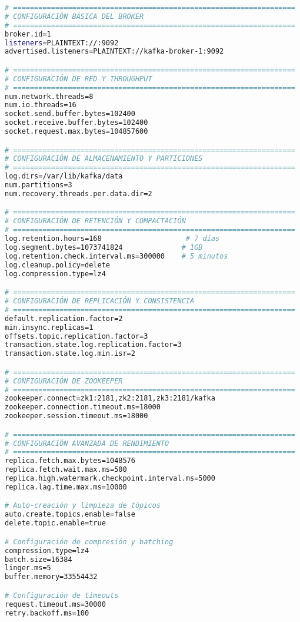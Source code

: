 \begin{lstlisting}[language=bash, caption=Configuración de Broker Kafka para Alto Rendimiento, label=lst:kafka_config]
# ===================================================================
# CONFIGURACIÓN BÁSICA DEL BROKER
# ===================================================================
broker.id=1
listeners=PLAINTEXT://:9092
advertised.listeners=PLAINTEXT://kafka-broker-1:9092

# ===================================================================
# CONFIGURACIÓN DE RED Y THROUGHPUT
# ===================================================================
num.network.threads=8
num.io.threads=16
socket.send.buffer.bytes=102400
socket.receive.buffer.bytes=102400
socket.request.max.bytes=104857600

# ===================================================================
# CONFIGURACIÓN DE ALMACENAMIENTO Y PARTICIONES
# ===================================================================
log.dirs=/var/lib/kafka/data
num.partitions=3
num.recovery.threads.per.data.dir=2

# ===================================================================
# CONFIGURACIÓN DE RETENCIÓN Y COMPACTACIÓN
# ===================================================================
log.retention.hours=168                    # 7 días
log.segment.bytes=1073741824              # 1GB
log.retention.check.interval.ms=300000    # 5 minutos
log.cleanup.policy=delete
log.compression.type=lz4

# ===================================================================
# CONFIGURACIÓN DE REPLICACIÓN Y CONSISTENCIA
# ===================================================================
default.replication.factor=2
min.insync.replicas=1
offsets.topic.replication.factor=3
transaction.state.log.replication.factor=3
transaction.state.log.min.isr=2

# ===================================================================
# CONFIGURACIÓN DE ZOOKEEPER
# ===================================================================
zookeeper.connect=zk1:2181,zk2:2181,zk3:2181/kafka
zookeeper.connection.timeout.ms=18000
zookeeper.session.timeout.ms=18000

# ===================================================================
# CONFIGURACIÓN AVANZADA DE RENDIMIENTO
# ===================================================================
replica.fetch.max.bytes=1048576
replica.fetch.wait.max.ms=500
replica.high.watermark.checkpoint.interval.ms=5000
replica.lag.time.max.ms=10000

# Auto-creación y limpieza de tópicos
auto.create.topics.enable=false
delete.topic.enable=true

# Configuración de compresión y batching
compression.type=lz4
batch.size=16384
linger.ms=5
buffer.memory=33554432

# Configuración de timeouts
request.timeout.ms=30000
retry.backoff.ms=100
\end{lstlisting}

